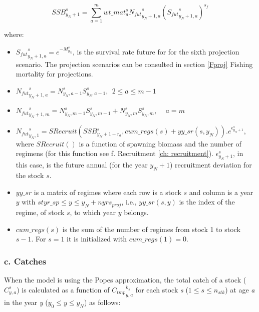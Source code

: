 \documentclass{article}
\begin{document}
\begin{equation}
    SSB^s_{y_N+1}= \sum_{a=1}^m wt\_{mat}^s_a{N_{fut}}^s_{y_N+1,a}({{S_{fut}}^s_{y_N+1,a}})^{s_f}
\end{equation}

where: 

\begin{itemize}

    \item ${S_{fut}}^s_{y_N+1,a} = e^{-M^s_{y_N}}$, is the survival rate future for %
    for the sixth projection scenario. The projection scenarios can be consulted in section \ref{Fproj} Fishing mortality for projections.

    \item ${N_{fut}}^s_{y_N+1,a} = N^s_{y_N,a-1}S^s_{y_N,a-1}, \ \ 2\leq a \leq m-1$
    
    \item ${N_{fut}}^s_{y_N+1,m} = N^s_{y_N,m-1}S^s_{y_N,m-1}+N^s_{y_N,m}S^s_{y_N,m}$, \ \ $a = m$ 
    
    \item ${N_{fut}}^s_{y_N,1} = SRecruit(SSB^s_{y_N+1-r_a},cum\_regs(s)+yy\_sr(s,y_N)).e^{\epsilon^s_{y_N+1}}$, where $SRecruit()$ is a function of spawning biomass and the number of regimens (for this function see f. Recruitment \ref{ch: recruitment}).
    $\epsilon^s_{y_N+1}$, in this case, is the future annual (for the year $y_N+1$) recruitment deviation for the stock $s$. 
    \item $yy\_sr$ is a matrix of regimes where each row is a stock $s$ and column is a year $y$ with $styr\_sp \leq y \leq y_N + nyrs_{proj}$, i.e., $yy\_sr(s,y)$ is the index of the regime, of stock $s$, to which year $y$ belongs.
    \item $cum\_regs(s)$ is the sum of the number of regimes from stock 1 to stock  $s-1$. For $s=1$ it is initialized with $cum\_regs(1)=0$. 
    
\end{itemize}


\hfill

\subsubsection{c. Catches}\label{ch: catches}
When the model is using the Popes approximation, the total catch of a stock ($C^s_{y,a}$) is calculated as a function of ${C_{tmp}}^{k_s}_{y,a}$ for each stock \textit{s} ($1\leq s \leq n_{stk}$) at age \textit{a} in the year \textit{y} ($y_0 \leq y \leq y_N$) as follows: 
\end{document}
